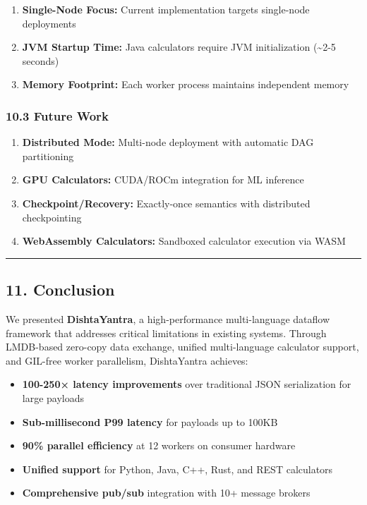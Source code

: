 \documentclass[
]{article}
\providecommand{\tightlist}{%
  \setlength{\itemsep}{0pt}\setlength{\parskip}{0pt}}
\begin{document}
\begin{enumerate}
\def\labelenumi{\arabic{enumi}.}
\tightlist
\item
  \textbf{Single-Node Focus:} Current implementation targets single-node
  deployments
\item
  \textbf{JVM Startup Time:} Java calculators require JVM initialization
  (\textasciitilde2-5 seconds)
\item
  \textbf{Memory Footprint:} Each worker process maintains independent
  memory
\end{enumerate}

\hypertarget{future-work}{%
\subsubsection{10.3 Future Work}\label{future-work}}

\begin{enumerate}
\def\labelenumi{\arabic{enumi}.}
\tightlist
\item
  \textbf{Distributed Mode:} Multi-node deployment with automatic DAG
  partitioning
\item
  \textbf{GPU Calculators:} CUDA/ROCm integration for ML inference
\item
  \textbf{Checkpoint/Recovery:} Exactly-once semantics with distributed
  checkpointing
\item
  \textbf{WebAssembly Calculators:} Sandboxed calculator execution via
  WASM
\end{enumerate}

\begin{center}\rule{0.5\linewidth}{0.5pt}\end{center}

\hypertarget{conclusion}{%
\subsection{11. Conclusion}\label{conclusion}}

We presented \textbf{DishtaYantra}, a high-performance multi-language
dataflow framework that addresses critical limitations in existing
systems. Through LMDB-based zero-copy data exchange, unified
multi-language calculator support, and GIL-free worker parallelism,
DishtaYantra achieves:

\begin{itemize}
\tightlist
\item
  \textbf{100-250× latency improvements} over traditional JSON
  serialization for large payloads
\item
  \textbf{Sub-millisecond P99 latency} for payloads up to 100KB
\item
  \textbf{90\% parallel efficiency} at 12 workers on consumer hardware
\item
  \textbf{Unified support} for Python, Java, C++, Rust, and REST
  calculators
\item
  \textbf{Comprehensive pub/sub} integration with 10+ message brokers
\end{itemize}
\end{document}
